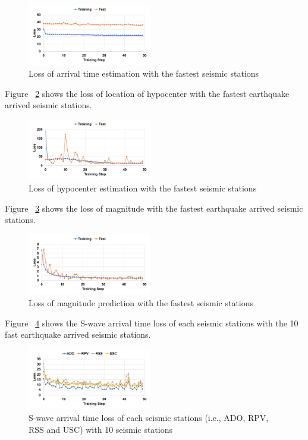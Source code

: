 \begin{figure}[t]
\includegraphics[width=0.48\textwidth]{figs/arrival_loss_1.pdf}
\caption{Loss of arrival time estimation with the fastest seismic stations}
\label{fig:arrival_loss_1}
\end{figure}

Figure ~\ref{fig:center_loss_1} shows the loss of location of hypocenter with the fastest earthquake arrived seismic stations.

\begin{figure}[t]
\includegraphics[width=0.48\textwidth]{figs/center_loss_1.pdf}
\caption{Loss of hypocenter estimation with the fastest seismic stations}
\label{fig:center_loss_1}
\end{figure}

Figure ~\ref{fig:mag_loss_1} shows the loss of magnitude with the fastest earthquake arrived seismic stations.

\begin{figure}[t]
\includegraphics[width=0.48\textwidth]{figs/mag_loss_1.pdf}
\caption{Loss of magnitude prediction with the fastest seismic stations}
\label{fig:mag_loss_1}
\end{figure}


Figure ~\ref{fig:arrival_each} shows the S-wave arrival time loss of each seismic stations with the 10 fast earthquake arrived seismic stations.

\begin{figure}[t]
\includegraphics[width=0.48\textwidth]{figs/arrival_loss_detail_10.pdf}
\caption{S-wave arrival time loss of each seismic stations (i.e., ADO, RPV, RSS and USC) with 10 seismic stations}
\label{fig:arrival_each}
\end{figure}

